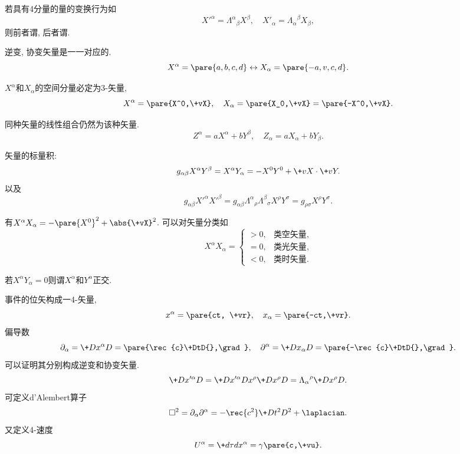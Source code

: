 \documentclass[hidelinks]{ctexart}
\begin{document}
若具有4分量的量的变换行为如
\[ X'^\alpha = {\Lambda^\alpha}_\beta X^\beta, \quad X'_\alpha = {\Lambda_\alpha}^\beta X_\beta, \]
则前者谓, 后者谓.
\begin{cenum}
    \item 逆变, 协变矢量是一一对应的.
    \[ X^\alpha = \pare{a,b,c,d} \leftrightarrow X_\alpha = \pare{-a,v,c,d}. \]
    \item $X^\alpha$和$X_\alpha$的空间分量必定为3-矢量,
    \[ X^\alpha = \pare{X^0,\+vX},\quad X_\alpha = \pare{X_0,\+vX} = \pare{-X^0,\+vX}. \]
    \item 同种矢量的线性组合仍然为该种矢量.
    \[ Z^\alpha = aX^\alpha + bY^\beta,\quad Z_\alpha = aX_\alpha + bY_\beta. \]
    \item 矢量的标量积:
    \[ g_{\alpha\beta}X^\alpha Y^\beta = X^\alpha Y_\alpha = -X^0 Y^0 + \+vX\cdot \+vY. \]
    以及
    \[ g_{\alpha\beta}X'^\alpha X'^\beta = g_{\alpha\beta}{\Lambda^\alpha}_\rho {\Lambda^\beta}_\sigma X^\rho Y^\sigma = g_{\rho\sigma} X^\rho Y^\sigma. \]
    \begin{cenum}
        \item 有$X^\alpha X_\alpha = -\pare{X^0}^2 + \abs{\+vX}^2$. 可以对矢量分类如
        \[ X^\alpha X_\alpha = \begin{cases}
            >0, & \text{类空矢量}, \\
            = 0, & \text{类光矢量}, \\
            <0, & \text{类时矢量}.
        \end{cases} \]
        \item 若$X^\alpha Y_\alpha = 0$则谓$X^\alpha$和$Y^\alpha$正交.
    \end{cenum}
\end{cenum}
事件的位矢构成一4-矢量,
\[ x^\alpha = \pare{ct, \+vr},\quad x_\alpha = \pare{-ct,\+vr}. \]
偏导数
\[ \partial_\alpha = \+D{x^\alpha}D{} = \pare{\rec{c}\+DtD{},\grad},\quad \partial^\alpha = \+D{x_\alpha}D{} = \pare{-\rec{c}\+DtD{},\grad}. \]
可以证明其分别构成逆变和协变矢量.
\[ \+D{x'^\alpha}D{} = \+D{x'^\alpha}D{x^\rho}\+D{x^\rho}D{} = {\Lambda_\alpha}^\rho \+D{x^\rho}D{}. \]
可定义d'Alembert算子
\[ \Box{}^2 = \partial_\alpha \partial^\alpha = -\rec{c^2}\+D{t^2}D{^2} + \laplacian. \]
又定义4-速度
\[ U^\alpha = \+d{\tau}d{x^\alpha} = \gamma\pare{c,\+vu}. \]
\end{document}
